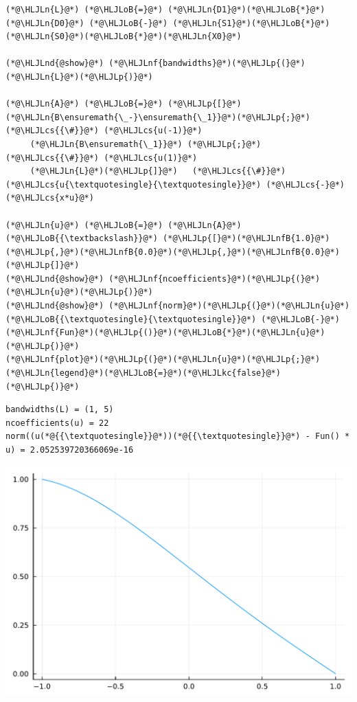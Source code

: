 \documentclass[12pt,a4paper]{article}
\newcommand{\HLJLkc}[1]{\textcolor[RGB]{59,151,46}{\textit{#1}}}
\newcommand{\HLJLn}[1]{#1}
\newcommand{\HLJLnd}[1]{\textcolor[RGB]{214,102,97}{#1}}
\newcommand{\HLJLnf}[1]{\textcolor[RGB]{66,102,213}{#1}}
\newcommand{\HLJLnfB}[1]{\textcolor[RGB]{59,151,46}{#1}}
\newcommand{\HLJLoB}[1]{\textcolor[RGB]{102,102,102}{\textbf{#1}}}
\newcommand{\HLJLp}[1]{#1}
\newcommand{\HLJLcs}[1]{\textcolor[RGB]{153,153,119}{\textit{#1}}}
\begin{document}
\begin{lstlisting}
(*@\HLJLn{L}@*) (*@\HLJLoB{=}@*) (*@\HLJLn{D1}@*)(*@\HLJLoB{*}@*)(*@\HLJLn{D0}@*) (*@\HLJLoB{-}@*) (*@\HLJLn{S1}@*)(*@\HLJLoB{*}@*)(*@\HLJLn{S0}@*)(*@\HLJLoB{*}@*)(*@\HLJLn{X0}@*)

(*@\HLJLnd{@show}@*) (*@\HLJLnf{bandwidths}@*)(*@\HLJLp{(}@*)(*@\HLJLn{L}@*)(*@\HLJLp{)}@*)

(*@\HLJLn{A}@*) (*@\HLJLoB{=}@*) (*@\HLJLp{[}@*)(*@\HLJLn{B\ensuremath{\_-}\ensuremath{\_1}}@*)(*@\HLJLp{;}@*)   (*@\HLJLcs{{\#}}@*) (*@\HLJLcs{u(-1)}@*)
     (*@\HLJLn{B\ensuremath{\_1}}@*) (*@\HLJLp{;}@*)   (*@\HLJLcs{{\#}}@*) (*@\HLJLcs{u(1)}@*)
     (*@\HLJLn{L}@*)(*@\HLJLp{]}@*)   (*@\HLJLcs{{\#}}@*) (*@\HLJLcs{u{\textquotesingle}{\textquotesingle}}@*) (*@\HLJLcs{-}@*) (*@\HLJLcs{x*u}@*)

(*@\HLJLn{u}@*) (*@\HLJLoB{=}@*) (*@\HLJLn{A}@*) (*@\HLJLoB{{\textbackslash}}@*) (*@\HLJLp{[}@*)(*@\HLJLnfB{1.0}@*)(*@\HLJLp{,}@*)(*@\HLJLnfB{0.0}@*)(*@\HLJLp{,}@*)(*@\HLJLnfB{0.0}@*)(*@\HLJLp{]}@*)
(*@\HLJLnd{@show}@*) (*@\HLJLnf{ncoefficients}@*)(*@\HLJLp{(}@*)(*@\HLJLn{u}@*)(*@\HLJLp{)}@*)
(*@\HLJLnd{@show}@*) (*@\HLJLnf{norm}@*)(*@\HLJLp{(}@*)(*@\HLJLn{u}@*)(*@\HLJLoB{{\textquotesingle}{\textquotesingle}}@*) (*@\HLJLoB{-}@*) (*@\HLJLnf{Fun}@*)(*@\HLJLp{()}@*)(*@\HLJLoB{*}@*)(*@\HLJLn{u}@*) (*@\HLJLp{)}@*)
(*@\HLJLnf{plot}@*)(*@\HLJLp{(}@*)(*@\HLJLn{u}@*)(*@\HLJLp{;}@*) (*@\HLJLn{legend}@*)(*@\HLJLoB{=}@*)(*@\HLJLkc{false}@*)(*@\HLJLp{)}@*)
\end{lstlisting}

\begin{lstlisting}
bandwidths(L) = (1, 5)
ncoefficients(u) = 22
norm((u(*@{{\textquotesingle}}@*))(*@{{\textquotesingle}}@*) - Fun() * u) = 2.052539720366069e-16
\end{lstlisting}

\includegraphics[width=\linewidth]{jl_GsbqQZ/Chapter4_33_1.pdf}
\end{document}
